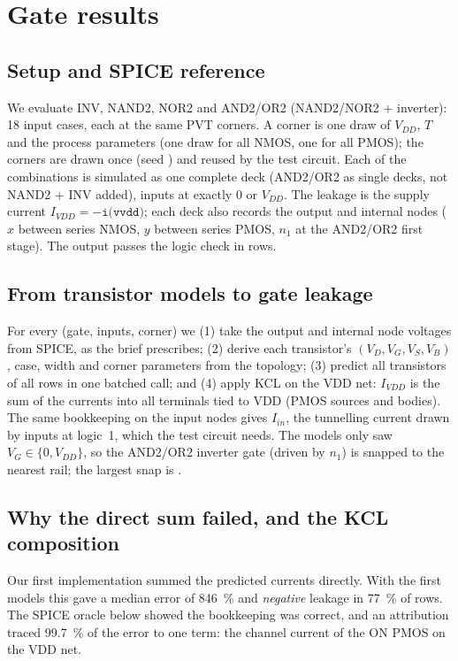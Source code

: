 \section{Gate results}\label{sec:gates}

\subsection{Setup and SPICE reference}
We evaluate INV, NAND2, NOR2 and AND2/OR2 (NAND2/NOR2 + inverter): 18 input cases, each at the
same \NumCorners{} PVT corners. A corner is one draw of $V_{DD}$, $T$ and the process parameters
(one draw for all NMOS, one for all PMOS); the corners are drawn once (seed \SeedCorners) and
reused by the test circuit. Each of the \NumGateSims{} combinations is simulated as one complete
deck (AND2/OR2 as single decks, not NAND2 + INV added), inputs at exactly $0$ or $V_{DD}$. The
leakage is the supply current $I_{VDD}=-\texttt{i(vvdd)}$; each deck also records the output and
internal nodes ($x$ between series NMOS, $y$ between series PMOS, $n_1$ at the AND2/OR2 first
stage). The output passes the logic check in \GateLogicOk{} rows.

\subsection{From transistor models to gate leakage}
For every (gate, inputs, corner) we (1) take the output and internal node voltages from SPICE, as
the brief prescribes; (2) derive each transistor's $(V_D,V_G,V_S,V_B)$, case, width and corner
parameters from the topology; (3) predict all transistors of all \NumGateSims{} rows in one
batched call; and (4) apply KCL on the VDD net: $I_{VDD}$ is the sum of the currents into all
terminals tied to VDD (PMOS sources and bodies). The same bookkeeping on the input nodes gives
$I_{in}$, the tunnelling current drawn by inputs at logic~1, which the test circuit needs. The
models only saw $V_G\in\{0,V_{DD}\}$, so the AND2/OR2 inverter gate (driven by $n_1$) is snapped to
the nearest rail; the largest snap is \GateSnapMax{}.

\subsection{Why the direct sum failed, and the KCL composition}\label{sec:kcl}
Our first implementation summed the predicted currents directly. With the first models this gave
a median error of \qty{846}{\percent} and \emph{negative} leakage in \qty{77}{\percent} of rows.
The SPICE oracle below showed the bookkeeping was correct, and an attribution traced
\qty{99.7}{\percent} of the error to one term: the channel current of the ON PMOS on the VDD net.

